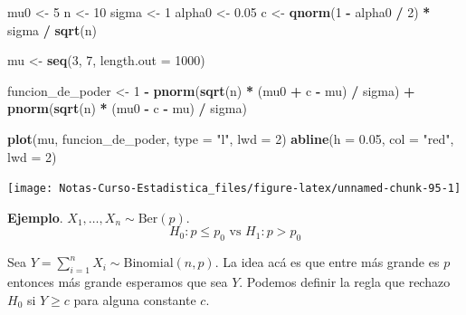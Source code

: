 \documentclass[
  12pt,
]{book}
\newenvironment{Shaded}{\begin{snugshade}}{\end{snugshade}}
\newcommand{\DataTypeTok}[1]{\textcolor[rgb]{0.13,0.29,0.53}{#1}}
\newcommand{\DecValTok}[1]{\textcolor[rgb]{0.00,0.00,0.81}{#1}}
\newcommand{\FloatTok}[1]{\textcolor[rgb]{0.00,0.00,0.81}{#1}}
\newcommand{\KeywordTok}[1]{\textcolor[rgb]{0.13,0.29,0.53}{\textbf{#1}}}
\newcommand{\NormalTok}[1]{#1}
\newcommand{\OperatorTok}[1]{\textcolor[rgb]{0.81,0.36,0.00}{\textbf{#1}}}
\newcommand{\StringTok}[1]{\textcolor[rgb]{0.31,0.60,0.02}{#1}}
\begin{document}
\begin{Shaded}
\begin{Highlighting}[]
\NormalTok{mu0 \textless{}{-}}\StringTok{ }\DecValTok{5}
\NormalTok{n \textless{}{-}}\StringTok{ }\DecValTok{10}
\NormalTok{sigma \textless{}{-}}\StringTok{ }\DecValTok{1}
\NormalTok{alpha0 \textless{}{-}}\StringTok{ }\FloatTok{0.05}
\NormalTok{c \textless{}{-}}\StringTok{ }\KeywordTok{qnorm}\NormalTok{(}\DecValTok{1} \OperatorTok{{-}}\StringTok{ }\NormalTok{alpha0 }\OperatorTok{/}\StringTok{ }\DecValTok{2}\NormalTok{) }\OperatorTok{*}\StringTok{ }\NormalTok{sigma }\OperatorTok{/}\StringTok{ }\KeywordTok{sqrt}\NormalTok{(n)}

\NormalTok{mu \textless{}{-}}\StringTok{ }\KeywordTok{seq}\NormalTok{(}\DecValTok{3}\NormalTok{, }\DecValTok{7}\NormalTok{, }\DataTypeTok{length.out =} \DecValTok{1000}\NormalTok{)}

\NormalTok{funcion\_de\_poder \textless{}{-}}\StringTok{ }\DecValTok{1} \OperatorTok{{-}}
\StringTok{  }\KeywordTok{pnorm}\NormalTok{(}\KeywordTok{sqrt}\NormalTok{(n) }\OperatorTok{*}\StringTok{ }\NormalTok{(mu0 }\OperatorTok{+}\StringTok{ }\NormalTok{c }\OperatorTok{{-}}\StringTok{ }\NormalTok{mu) }\OperatorTok{/}\StringTok{ }\NormalTok{sigma) }\OperatorTok{+}
\StringTok{  }\KeywordTok{pnorm}\NormalTok{(}\KeywordTok{sqrt}\NormalTok{(n) }\OperatorTok{*}\StringTok{ }\NormalTok{(mu0 }\OperatorTok{{-}}\StringTok{ }\NormalTok{c }\OperatorTok{{-}}\StringTok{ }\NormalTok{mu) }\OperatorTok{/}\StringTok{ }\NormalTok{sigma)}

\KeywordTok{plot}\NormalTok{(mu, funcion\_de\_poder, }\DataTypeTok{type =} \StringTok{"l"}\NormalTok{, }\DataTypeTok{lwd =} \DecValTok{2}\NormalTok{)}
\KeywordTok{abline}\NormalTok{(}\DataTypeTok{h =} \FloatTok{0.05}\NormalTok{, }\DataTypeTok{col =} \StringTok{"red"}\NormalTok{, }\DataTypeTok{lwd =} \DecValTok{2}\NormalTok{)}
\end{Highlighting}
\end{Shaded}

\begin{center}\texttt{[image: Notas-Curso-Estadistica\_files/figure-latex/unnamed-chunk-95-1]} \end{center}

\textbf{Ejemplo}. \(X_1,\dots,X_n \sim \text{Ber}(p)\).
\[H_0: p\leq p_{0} \text{ vs } H_1: p>p_0\]

Sea \(Y = \sum_{i=1}^nX_i \sim \text{Binomial}(n,p)\).
La idea acá es que entre más grande es \(p\) entonces más grande esperamos que
sea \(Y\). Podemos definir la regla que rechazo \(H_0\) si \(Y\geq c\) para alguna
constante \(c\).
\end{document}
